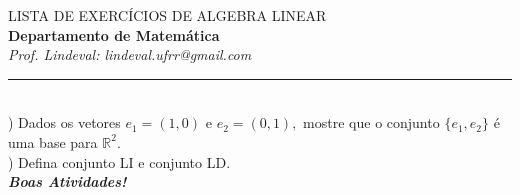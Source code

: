 \documentclass[12pt,a4paper]{article}
\begin{document}
\begin{center}
\large LISTA DE EXERCÍCIOS DE ALGEBRA LINEAR\\[1mm]
{\large\bf Departamento de Matemática}\\[1mm] \textit{Prof. Lindeval: lindeval.ufrr@gmail.com}\\\end{center}

\noindent\rule{17.0cm}{0.7mm}\\[0.5cm]
) Dados os vetores $e_1=(1,0)$  e $e_2=(0,1),$ mostre que o conjunto $\{e_1,e_2\}$ é uma base para $\mathbb{R}^2.$\\[2mm]
) Defina conjunto LI e conjunto LD.\\[2mm]
\vfill\hfill\bf{\textit{Boas Atividades!}}
\end{document}
